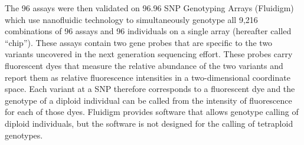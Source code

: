 \documentclass[twocolumn,natbib]{svjour3}       %
\begin{document}
The 96 assays were then validated on 96.96 SNP Genotyping Arrays (Fluidigm) 
which use nanofluidic technology to simultaneously genotype all 9,216 
combinations of 96 assays and 96 individuals on a single array (hereafter called ``chip''). 
These assays contain two gene probes that are specific to the two variants 
uncovered in the next generation sequencing effort. These probes carry 
fluorescent dyes that measure the relative abundance of the two variants 
and report them as relative fluorescence intensities in a two-dimensional 
coordinate space. Each variant at a SNP therefore corresponds to a 
fluorescent dye and the genotype of a diploid individual can be called 
from the intensity of fluorescence for each of those dyes. 
Fluidigm provides software that allows genotype calling of diploid 
individuals, but the software is not designed for the calling of tetraploid genotypes. 
\end{document}
